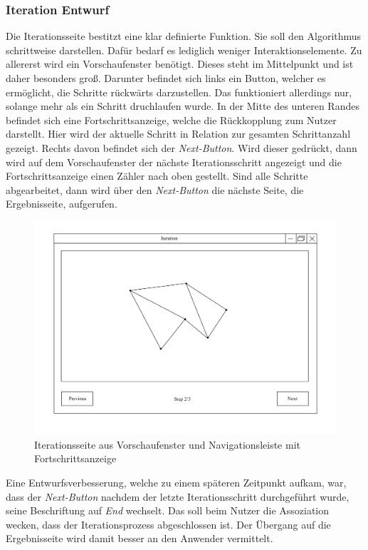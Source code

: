 \subsubsection{Iteration Entwurf}
Die Iterationsseite bestitzt eine klar definierte Funktion. Sie soll den Algorithmus schrittweise darstellen. Dafür bedarf es lediglich weniger Interaktionselemente. 
Zu allererst wird ein Vorschaufenster benötigt. Dieses steht im Mittelpunkt und ist daher besonders groß. Darunter befindet sich links ein Button, welcher es ermöglicht, die Schritte rückwärts darzustellen. Das funktioniert allerdings nur,
solange mehr als ein Schritt druchlaufen wurde. In der Mitte des unteren Randes befindet sich eine Fortschrittsanzeige, welche die Rückkopplung zum Nutzer darstellt. Hier wird der aktuelle Schritt in Relation zur gesamten Schrittanzahl gezeigt.
Rechts davon befindet sich der \emph{Next-Button}. Wird dieser gedrückt, dann wird auf dem Vorschaufenster der nächste Iterationsschritt angezeigt und die Fortschrittsanzeige einen Zähler nach oben gestellt.
Sind alle Schritte abgearbeitet, dann wird über den \emph{Next-Button} die nächste Seite, die Ergebnisseite, aufgerufen.

\begin{figure}[h]
    \includegraphics[width=1\textwidth]{bilder/iteration.png}
    \caption[Entwurf Iterationsseite]{Iterationsseite aus Vorschaufenster und Navigationsleiste mit Fortschrittsanzeige}
    \label{fig:iteration}
\end{figure}

Eine Entwurfsverbesserung, welche zu einem späteren Zeitpunkt aufkam, war, dass der \emph{Next-Button} nachdem der letzte Iterationsschritt durchgeführt wurde, seine Beschriftung auf \emph{End} wechselt.
Das soll beim Nutzer die Assoziation wecken, dass der Iterationsprozess abgeschlossen ist. Der Übergang auf die Ergebnisseite wird damit besser an den Anwender vermittelt.


